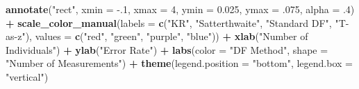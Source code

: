 \documentclass[12pt, twoside]{amherstthesis}
\newenvironment{Shaded}{\begin{snugshade}}{\end{snugshade}}
\newcommand{\DataTypeTok}[1]{\textcolor[rgb]{0.13,0.29,0.53}{#1}}
\newcommand{\DecValTok}[1]{\textcolor[rgb]{0.00,0.00,0.81}{#1}}
\newcommand{\FloatTok}[1]{\textcolor[rgb]{0.00,0.00,0.81}{#1}}
\newcommand{\KeywordTok}[1]{\textcolor[rgb]{0.13,0.29,0.53}{\textbf{#1}}}
\newcommand{\NormalTok}[1]{#1}
\newcommand{\OperatorTok}[1]{\textcolor[rgb]{0.81,0.36,0.00}{\textbf{#1}}}
\newcommand{\StringTok}[1]{\textcolor[rgb]{0.31,0.60,0.02}{#1}}
\begin{document}
\begin{Shaded}
\begin{Highlighting}[]
{{{{{{{{{{\StringTok{  }\KeywordTok{annotate}\NormalTok{(}\StringTok{"rect"}\NormalTok{, }\DataTypeTok{xmin =} \FloatTok{-.1}\NormalTok{, }\DataTypeTok{xmax =} \DecValTok{4}\NormalTok{, }\DataTypeTok{ymin =} \FloatTok{0.025}\NormalTok{, }\DataTypeTok{ymax =} \FloatTok{.075}\NormalTok{, }
           \DataTypeTok{alpha =} \FloatTok{.4}\NormalTok{) }\OperatorTok{+}
\StringTok{  }\KeywordTok{scale_color_manual}\NormalTok{(}\DataTypeTok{labels =} \KeywordTok{c}\NormalTok{(}\StringTok{"KR"}\NormalTok{, }\StringTok{"Satterthwaite"}\NormalTok{, }\StringTok{"Standard DF"}\NormalTok{, }
                                \StringTok{"T-as-z"}\NormalTok{), }
                     \DataTypeTok{values =} \KeywordTok{c}\NormalTok{(}\StringTok{"red"}\NormalTok{, }\StringTok{"green"}\NormalTok{, }\StringTok{"purple"}\NormalTok{, }\StringTok{"blue"}\NormalTok{)) }\OperatorTok{+}
\StringTok{  }\KeywordTok{xlab}\NormalTok{(}\StringTok{"Number of Individuals"}\NormalTok{) }\OperatorTok{+}
\StringTok{  }\KeywordTok{ylab}\NormalTok{(}\StringTok{"Error Rate"}\NormalTok{) }\OperatorTok{+}
\StringTok{  }\KeywordTok{labs}\NormalTok{(}\DataTypeTok{color =} \StringTok{"DF Method"}\NormalTok{, }\DataTypeTok{shape =} \StringTok{"Number of Measurements"}\NormalTok{) }\OperatorTok{+}
\StringTok{  }\KeywordTok{theme}\NormalTok{(}\DataTypeTok{legend.position =} \StringTok{"bottom"}\NormalTok{, }\DataTypeTok{legend.box =} \StringTok{"vertical"}\NormalTok{)}


}}}}}}}}}}
\end{Highlighting}
\end{Shaded}
\end{document}
